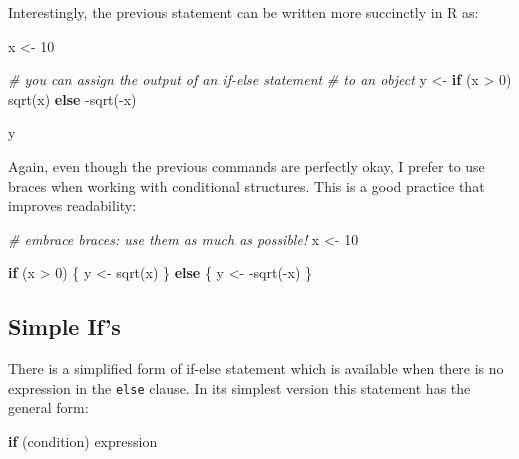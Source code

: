 \documentclass[
]{book}
\newenvironment{Shaded}{\begin{snugshade}}{\end{snugshade}}
\newcommand{\CommentTok}[1]{\textcolor[rgb]{0.56,0.35,0.01}{\textit{#1}}}
\newcommand{\ControlFlowTok}[1]{\textcolor[rgb]{0.13,0.29,0.53}{\textbf{#1}}}
\newcommand{\DecValTok}[1]{\textcolor[rgb]{0.00,0.00,0.81}{#1}}
\newcommand{\FunctionTok}[1]{\textcolor[rgb]{0.00,0.00,0.00}{#1}}
\newcommand{\NormalTok}[1]{#1}
\newcommand{\OtherTok}[1]{\textcolor[rgb]{0.56,0.35,0.01}{#1}}
\newcommand{\SpecialCharTok}[1]{\textcolor[rgb]{0.00,0.00,0.00}{#1}}
\begin{document}
Interestingly, the previous statement can be written more succinctly in R as:

\begin{Shaded}
\begin{Highlighting}[]
\NormalTok{x }\OtherTok{\textless{}{-}} \DecValTok{10}

\CommentTok{\# you can assign the output of an if{-}else statement}
\CommentTok{\# to an object}
\NormalTok{y }\OtherTok{\textless{}{-}} \ControlFlowTok{if}\NormalTok{ (x }\SpecialCharTok{\textgreater{}} \DecValTok{0}\NormalTok{) }\FunctionTok{sqrt}\NormalTok{(x) }\ControlFlowTok{else} \SpecialCharTok{{-}}\FunctionTok{sqrt}\NormalTok{(}\SpecialCharTok{{-}}\NormalTok{x)}

\NormalTok{y}
\end{Highlighting}
\end{Shaded}

Again, even though the previous commands are perfectly okay, I prefer to
use braces when working with conditional structures. This is a good practice
that improves readability:

\begin{Shaded}
\begin{Highlighting}[]
\CommentTok{\# embrace braces: use them as much as possible!}
\NormalTok{x }\OtherTok{\textless{}{-}} \DecValTok{10}

\ControlFlowTok{if}\NormalTok{ (x }\SpecialCharTok{\textgreater{}} \DecValTok{0}\NormalTok{) \{}
\NormalTok{  y }\OtherTok{\textless{}{-}} \FunctionTok{sqrt}\NormalTok{(x) }
\NormalTok{\} }\ControlFlowTok{else}\NormalTok{ \{}
\NormalTok{  y }\OtherTok{\textless{}{-}} \SpecialCharTok{{-}}\FunctionTok{sqrt}\NormalTok{(}\SpecialCharTok{{-}}\NormalTok{x)}
\NormalTok{\}}
\end{Highlighting}
\end{Shaded}

\hypertarget{simple-ifs}{%
\subsection{Simple If's}\label{simple-ifs}}

There is a simplified form of if-else statement which is available when
there is no expression in the \texttt{else} clause. In its simplest version this
statement has the general form:

\begin{Shaded}
\begin{Highlighting}[]
\ControlFlowTok{if}\NormalTok{ (condition) expression}
\end{Highlighting}
\end{Shaded}
\end{document}

